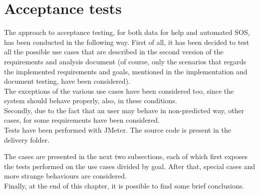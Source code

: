 \section{Acceptance tests}
The approach to acceptance testing, for both data for help and automated SOS, has been
conducted in the following way. 
First of all, it has been decided to test all the possible use cases that are described in the
second version of the requirements and analysis document (of course, only the scenarios that
regards the implemented requirements and goals, mentioned in the implementation and document testing, have been considered). \\
The exceptions of the various use cases have been considered too, since the system should
behave properly, also, in these conditions. \\
Secondly, due to the fact that an user may behave in non-predicted way, other cases, for some
requirements have been considered. \\
Tests have been performed with JMeter. The source code is present in the delivery folder.

\par
The cases are presented in the next two subsections, each of which first exposes the
tests performed on the use cases divided by goal. After that, special cases and more strange
behaviours are considered. \\
Finally, at the end of this chapter, it is possible to find some brief conclusions. 





